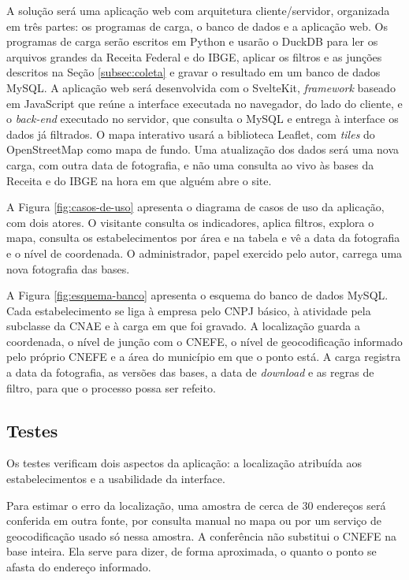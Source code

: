 A solução será uma aplicação web com arquitetura cliente/servidor, organizada em três partes: os programas de carga, o banco de dados e a aplicação web.
Os programas de carga serão escritos em Python e usarão o DuckDB para ler os arquivos grandes da Receita Federal e do IBGE, aplicar os filtros e as junções descritos na Seção \ref{subsec:coleta} e gravar o resultado em um banco de dados MySQL.
A aplicação web será desenvolvida com o SvelteKit, \textit{framework} baseado em JavaScript que reúne a interface executada no navegador, do lado do cliente, e o \textit{back-end} executado no servidor, que consulta o MySQL e entrega à interface os dados já filtrados.
O mapa interativo usará a biblioteca Leaflet, com \textit{tiles} do OpenStreetMap como mapa de fundo.
Uma atualização dos dados será uma nova carga, com outra data de fotografia, e não uma consulta ao vivo às bases da Receita e do IBGE na hora em que alguém abre o site.

A Figura \ref{fig:casos-de-uso} apresenta o diagrama de casos de uso da aplicação, com dois atores.
O visitante consulta os indicadores, aplica filtros, explora o mapa, consulta os estabelecimentos por área e na tabela e vê a data da fotografia e o nível de coordenada.
O administrador, papel exercido pelo autor, carrega uma nova fotografia das bases.



A Figura \ref{fig:esquema-banco} apresenta o esquema do banco de dados MySQL.
Cada estabelecimento se liga à empresa pelo CNPJ básico, à atividade pela subclasse da CNAE e à carga em que foi gravado.
A localização guarda a coordenada, o nível de junção com o CNEFE, o nível de geocodificação informado pelo próprio CNEFE e a área do município em que o ponto está.
A carga registra a data da fotografia, as versões das bases, a data de \textit{download} e as regras de filtro, para que o processo possa ser refeito.



\subsection{Testes}
\label{subsec:testes}

Os testes verificam dois aspectos da aplicação: a localização atribuída aos estabelecimentos e a usabilidade da interface.

Para estimar o erro da localização, uma amostra de cerca de 30 endereços será conferida em outra fonte, por consulta manual no mapa ou por um serviço de geocodificação usado só nessa amostra.
A conferência não substitui o CNEFE na base inteira.
Ela serve para dizer, de forma aproximada, o quanto o ponto se afasta do endereço informado.

